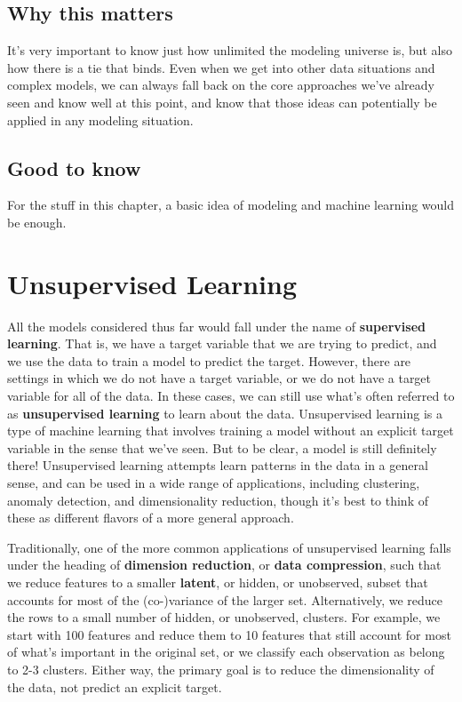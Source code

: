 \documentclass[
  letterpaper,
]{krantz}
\begin{document}
\subsection{Why this matters}\label{why-this-matters-2}

It's very important to know just how unlimited the modeling universe is,
but also how there is a tie that binds. Even when we get into other data
situations and complex models, we can always fall back on the core
approaches we've already seen and know well at this point, and know that
those ideas can potentially be applied in any modeling situation.

\subsection{Good to know}\label{good-to-know-2}

For the stuff in this chapter, a basic idea of modeling and machine
learning would be enough.

\section{Unsupervised Learning}\label{unsupervised-learning}

All the models considered thus far would fall under the name of
\textbf{supervised learning}. That is, we have a target variable that we
are trying to predict, and we use the data to train a model to predict
the target. However, there are settings in which we do not have a target
variable, or we do not have a target variable for all of the data. In
these cases, we can still use what's often referred to as
\textbf{unsupervised learning} to learn about the data. Unsupervised
learning is a type of machine learning that involves training a model
without an explicit target variable in the sense that we've seen. But to
be clear, a model is still definitely there! Unsupervised learning
attempts learn patterns in the data in a general sense, and can be used
in a wide range of applications, including clustering, anomaly
detection, and dimensionality reduction, though it's best to think of
these as different flavors of a more general approach.

Traditionally, one of the more common applications of unsupervised
learning falls under the heading of \textbf{dimension reduction}, or
\textbf{data compression}, such that we reduce features to a smaller
\textbf{latent}, or hidden, or unobserved, subset that accounts for most
of the (co-)variance of the larger set. Alternatively, we reduce the
rows to a small number of hidden, or unobserved, clusters. For example,
we start with 100 features and reduce them to 10 features that still
account for most of what's important in the original set, or we classify
each observation as belong to 2-3 clusters. Either way, the primary goal
is to reduce the dimensionality of the data, not predict an explicit
target.
\end{document}

